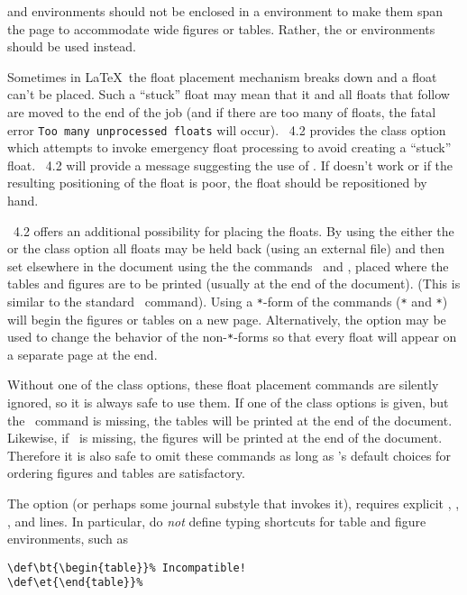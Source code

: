\documentclass[%
,aps%
 ,twocolumn%
 ,secnumarabic%
,amssymb, amsmath,nobibnotes, aps, prl, floatfix]{revtex4-2}
\begin{document}
 and  environments should not 
be enclosed in a  environment to make them span
the page to accommodate wide figures or tables. Rather, the
 or  environments should be used instead.

Sometimes in \LaTeX\ the float placement mechanism breaks down and a
float can't be placed. Such a ``stuck'' float may mean that it and all
floats that follow are moved to the end of the job (and if there are
too many of floats, the fatal error \texttt{Too many unprocessed floats}
will occur). \revtex~4.2 provides the class option
 which attempts to invoke emergency float
processing to avoid creating a ``stuck'' float. \revtex~4.2 will provide
a message suggesting the use of
. If  doesn't work or if
the resulting positioning of the float is poor, the float should be
repositioned by hand.

\revtex~4.2 offers an additional possibility for placing the floats. By
using the either the  or the
 class option all floats may be held
back (using an external file) and then set elsewhere in the document
using the the commands \cmd\printtables\ and \cmd\printfigures{},
placed where the tables and figures are to be printed (usually at the
end of the document).  (This is similar to the standard
\cmd\printindex\ command). Using a \texttt{*}-form of the commands
(\cmd\printfigures\verb+*+ and
\cmd\printtables\verb+*+) will begin the figures
or tables on a new page. Alternatively, the option
 may be used to change the behavior of the
non-\texttt{*}-forms so that every float will appear on a separate
page at the end.

Without one of the  class options, these float
placement commands are silently ignored, so it is always safe to use
them.  If one of the  class options is given,
but the \cmd\printtables\ command is missing, the tables will be
printed at the end of the document. Likewise, if \cmd\printfigures\ is
missing, the figures will be printed at the end of the document.
Therefore it is also safe to omit these commands as long as \revtex's
default choices for ordering figures and tables are satisfactory.

The  option (or perhaps some journal substyle
that invokes it), requires explicit , ,
, and  lines. In particular, do \emph{not}
define typing shortcuts for table and figure environments, such as
\begin{verbatim}
\def\bt{\begin{table}}% Incompatible!
\def\et{\end{table}}%
\end{verbatim}
\end{document}
